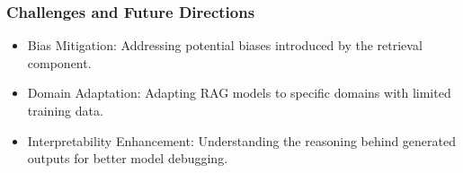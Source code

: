 \begin{frame}[fragile]\frametitle{Challenges and Future Directions}

\begin{itemize}
\item Bias Mitigation: Addressing potential biases introduced by the retrieval component.
\item Domain Adaptation: Adapting RAG models to specific domains with limited training data.
\item Interpretability Enhancement: Understanding the reasoning behind generated outputs for better model debugging.
\end{itemize}	

\end{frame}